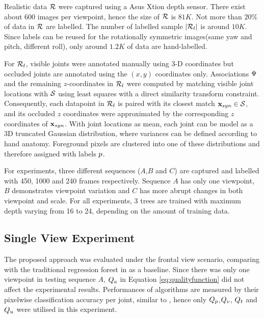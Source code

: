 Realistic data $\mathcal{R}$ were captured using a Asus Xtion depth sensor. There exist about $600$ images per viewpoint, hence the size of $\mathcal{R}$ is $81K$. Not more than $20\%$ of data in $\mathcal{R}$ are labelled. The number of labelled sample $|\mathcal{R}_{l}|$ is around $10K$. Since labels can be reused for the rotationally symmetric images(same yaw and pitch, different roll), only around $1.2K$ of data are hand-labelled.    

For $\mathcal{R}_{l}$, visible joints were annotated manually using 3-D coordinates but occluded joints are annotated using the $(x,y)$ coordinates only. 
Associations $\mathrm{\Psi}$ and the remaining $z$-coordinates in $\mathcal{R}_{l}$ were computed by matching visible joint locations with $\mathcal{S}$ using least squares with a direct similarity transform constraint. Consequently, each datapoint in $\mathcal{R}_{l}$ is paired with its closest match $\mathbf{x}_{syn} \in \mathcal{S}$, and its occluded $z$ coordinates were approximated by the corresponding $z$ coordinates of $\mathbf{x}_{syn}$.
With joint locations as mean, each joint can be model as a 3D truncated Gaussian distribution, where variances can be defined according to hand anatomy. Foreground pixels are clustered into one of these distributions and therefore assigned with labels $p$.

For experiments, three different sequences ($A$,$B$ and $C$) are captured and labelled with 450, 1000 and 240 frames respectively. Sequence $A$ has only one viewpoint, $B$ demonstrates viewpoint variation and $C$ has more abrupt changes in both viewpoint and scale. For all experiments, 3 trees are trained with maximum depth varying from 16 to 24, depending on the amount of training data.




\subsection{Single View Experiment} 

The proposed approach was evaluated under the frontal view scenario, comparing with the traditional regression forest in \cite{Gall2011} as a baseline. Since there was only one viewpoint in testing sequence $A$,  $Q_{a}$ in Equation \ref{eq:qualityfunction} did not affect the experimental results.  
Performances of algorithms are measured by their pixelwise classification accuracy per joint, similar to \cite{Shotton2011}, hence only $Q_{p}$,$Q_{v}$, $Q_{t}$ and $Q_{u}$ were utilised in this experiment.    

